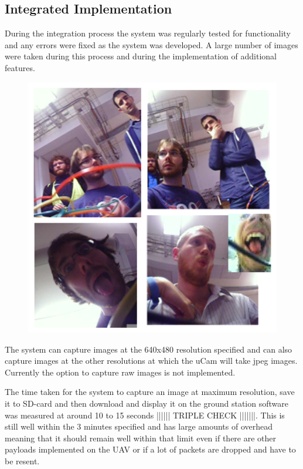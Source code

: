 \subsection{Integrated Implementation}

During the integration process the system was regularly tested for functionality and any errors were fixed as the system was developed. A large number of images were taken during this process and during the implementation of additional features.

\begin{figure}[H]
        \centering
        \includegraphics[width=1.00\textwidth]{figures/SampleImages1.png}
        \label{fig:Samples1}
\end{figure}

The system can capture images at the 640x480 resolution specified and can also capture images at the other resolutions at which the uCam will take jpeg images. Currently the option to capture raw images is not implemented.

The time taken for the system to capture an image at maximum resolution, save it to SD-card and then download and display it on the ground station software was measured at around 10 to 15 seconds |||||| TRIPLE CHECK |||||||. This is still well within the 3 minutes specified and has large amounts of overhead meaning that it should remain well within that limit even if there are other payloads implemented on the UAV or if a lot of packets are dropped and have to be resent.